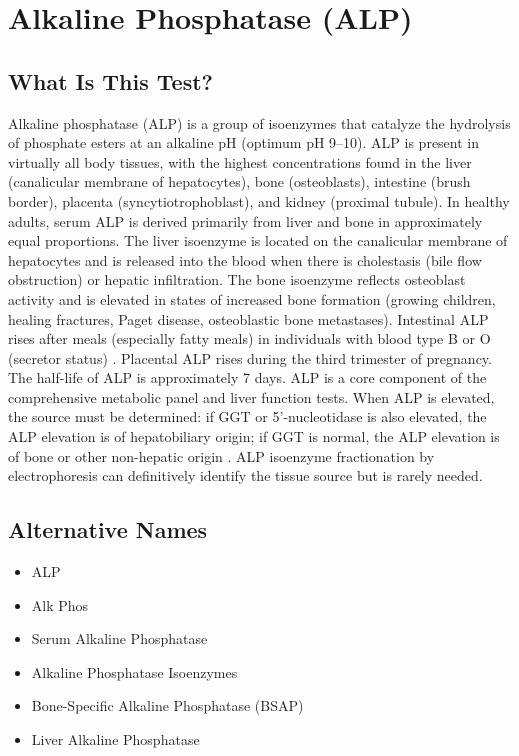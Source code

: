 \chapter{Alkaline Phosphatase (ALP)}

\section*{What Is This Test?}
Alkaline phosphatase (ALP) is a group of isoenzymes that catalyze the hydrolysis of phosphate esters at an alkaline pH (optimum pH 9--10). ALP is present in virtually all body tissues, with the highest concentrations found in the liver (canalicular membrane of hepatocytes), bone (osteoblasts), intestine (brush border), placenta (syncytiotrophoblast), and kidney (proximal tubule). In healthy adults, serum ALP is derived primarily from liver and bone in approximately equal proportions. The liver isoenzyme is located on the canalicular membrane of hepatocytes and is released into the blood when there is cholestasis (bile flow obstruction) or hepatic infiltration. The bone isoenzyme reflects osteoblast activity and is elevated in states of increased bone formation (growing children, healing fractures, Paget disease, osteoblastic bone metastases). Intestinal ALP rises after meals (especially fatty meals) in individuals with blood type B or O (secretor status) \cite{schiele1988total}. Placental ALP rises during the third trimester of pregnancy. The half-life of ALP is approximately 7 days. ALP is a core component of the comprehensive metabolic panel and liver function tests. When ALP is elevated, the source must be determined: if GGT or 5'-nucleotidase is also elevated, the ALP elevation is of hepatobiliary origin; if GGT is normal, the ALP elevation is of bone or other non-hepatic origin \cite{kwo2017acg}. ALP isoenzyme fractionation by electrophoresis can definitively identify the tissue source but is rarely needed.

\section*{Alternative Names}
\begin{itemize}
  \item ALP
  \item Alk Phos
  \item Serum Alkaline Phosphatase
  \item Alkaline Phosphatase Isoenzymes
  \item Bone-Specific Alkaline Phosphatase (BSAP)
  \item Liver Alkaline Phosphatase
\end{itemize}
